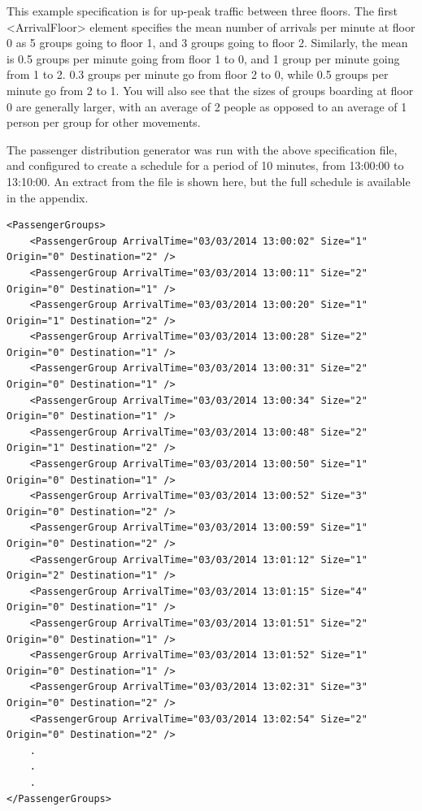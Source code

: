 \documentclass{UoYCSproject}
\begin{document}
This example specification is for up-peak traffic between three floors.  The first <ArrivalFloor> element specifies the mean number of arrivals per minute at floor 0 as 5 groups going to floor 1, and 3 groups going to floor 2.  Similarly, the mean is 0.5 groups per minute going from floor 1 to 0, and 1 group per minute going from 1 to 2.  0.3 groups per minute go from floor 2 to 0, while 0.5 groups per minute go from 2 to 1.  You will also see that the sizes of groups boarding at floor 0 are generally larger, with an average of 2 people as opposed to an average of 1 person per group for other movements.

The passenger distribution generator was run with the above specification file, and configured to create a schedule for a period of 10 minutes, from 13:00:00 to 13:10:00.  An extract from the file is shown here, but the full schedule is available in the appendix.

\begin{lstlisting}
<PassengerGroups>
	<PassengerGroup ArrivalTime="03/03/2014 13:00:02" Size="1" Origin="0" Destination="2" />
	<PassengerGroup ArrivalTime="03/03/2014 13:00:11" Size="2" Origin="0" Destination="1" />
	<PassengerGroup ArrivalTime="03/03/2014 13:00:20" Size="1" Origin="1" Destination="2" />
	<PassengerGroup ArrivalTime="03/03/2014 13:00:28" Size="2" Origin="0" Destination="1" />
	<PassengerGroup ArrivalTime="03/03/2014 13:00:31" Size="2" Origin="0" Destination="1" />
	<PassengerGroup ArrivalTime="03/03/2014 13:00:34" Size="2" Origin="0" Destination="1" />
	<PassengerGroup ArrivalTime="03/03/2014 13:00:48" Size="2" Origin="1" Destination="2" />
	<PassengerGroup ArrivalTime="03/03/2014 13:00:50" Size="1" Origin="0" Destination="1" />
	<PassengerGroup ArrivalTime="03/03/2014 13:00:52" Size="3" Origin="0" Destination="2" />
	<PassengerGroup ArrivalTime="03/03/2014 13:00:59" Size="1" Origin="0" Destination="2" />
	<PassengerGroup ArrivalTime="03/03/2014 13:01:12" Size="1" Origin="2" Destination="1" />
	<PassengerGroup ArrivalTime="03/03/2014 13:01:15" Size="4" Origin="0" Destination="1" />
	<PassengerGroup ArrivalTime="03/03/2014 13:01:51" Size="2" Origin="0" Destination="1" />
	<PassengerGroup ArrivalTime="03/03/2014 13:01:52" Size="1" Origin="0" Destination="1" />
	<PassengerGroup ArrivalTime="03/03/2014 13:02:31" Size="3" Origin="0" Destination="2" />
	<PassengerGroup ArrivalTime="03/03/2014 13:02:54" Size="2" Origin="0" Destination="2" />
	.
	.
	.
</PassengerGroups>
\end{lstlisting}
\end{document}
